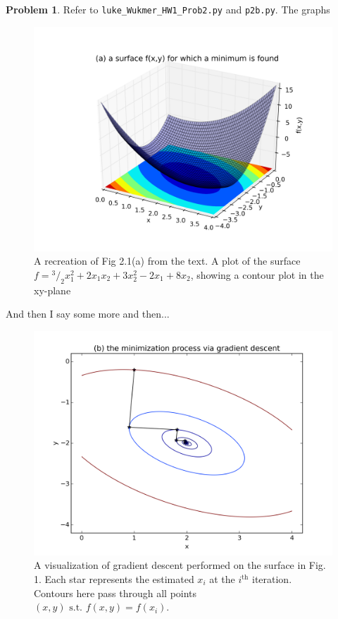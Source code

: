 \documentclass[10pt]{article}
\theoremstyle{plain}
\theoremstyle{definition}
\newtheorem{prob}{Problem}
\numberwithin{equation}{section}
\newcommand*\rfrac[2]{{}^{#1}\!/_{#2}}
\providecommand{\st}{\text{ s.t. }}
\begin{document}
\begin{prob}
    Refer to \texttt{luke\_Wukmer\_HW1\_Prob2.py} and \texttt{p2b.py}. The graphs
    \begin{figure}[h]
        \centering
        \includegraphics[width=\textwidth]{fig1}
        \caption{A recreation of Fig 2.1(a) from the text. A plot of the surface
            $f = \rfrac{3}{2}x_1^2 + 2x_1 x_2 + 3x_2^2 - 2x_1 + 8x_2$,
            showing a contour plot in the xy-plane}
    \end{figure}

    And then I say some more and then...
    
    \begin{figure}[h]
        \centering
        \includegraphics[width=\textwidth]{fig2}
        \caption{A visualization of gradient descent performed on the surface
            in Fig. 1. Each star represents the estimated $x_i$ at the
            $i^{\text{th}}$ iteration. Contours here pass through all points
            $(x,y) \st f(x,y) = f(x_i).$
        }
    \end{figure}
\end{prob}
\end{document}
